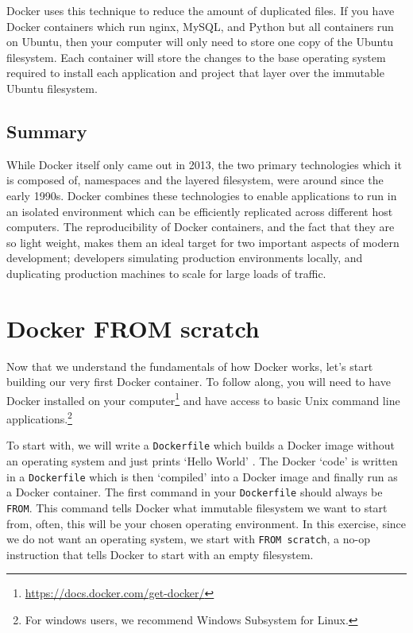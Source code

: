 Docker uses this technique to reduce the amount of duplicated files.
If you have Docker containers which run nginx, MySQL, and Python but all containers run on Ubuntu,
then your computer will only need to store one copy of the Ubuntu filesystem.
Each container will store the changes to the base operating system required to install each application and project that layer over the immutable Ubuntu filesystem.

\subsection{Summary}
While Docker itself only came out in 2013, the two primary technologies which it is composed of, namespaces and the layered filesystem,
were around since the early 1990s.
Docker combines these technologies to enable applications to run in an isolated environment which can be efficiently replicated across different host computers.
The reproducibility of Docker containers, and the fact that they are so light weight, makes them an ideal target for two important aspects of modern development;
developers simulating production environments locally, and duplicating production machines to scale for large loads of traffic.


\section{Docker FROM scratch}
Now that we understand the fundamentals of how Docker works, let's start building our very first Docker container.
To follow along, you will need to have Docker installed on your
computer\footnote{\url{https://docs.docker.com/get-docker/}} and have access to basic Unix command line
applications.\footnote{For windows users, we recommend Windows Subsystem for Linux.}

To start with, we will write a \texttt{Dockerfile} which builds a Docker image without an operating system and just prints `Hello World'
\cite{docker-from-scratch}.
The Docker `code' is written in a \texttt{Dockerfile} which is then `compiled' into a Docker image and finally run as a Docker container.
The first command in your \texttt{Dockerfile} should always be \texttt{FROM}.
This command tells Docker what immutable filesystem we want to start from, often, this will be your chosen operating environment.
In this exercise, since we do not want an operating system, we start with \texttt{FROM scratch},
a no-op instruction that tells Docker to start with an empty filesystem.

